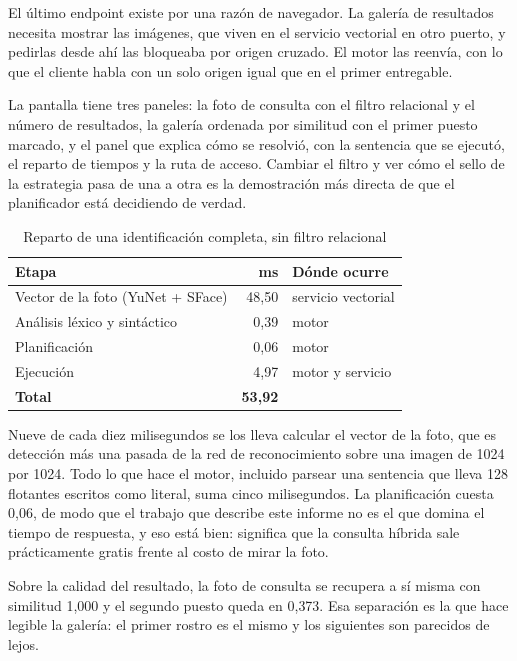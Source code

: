 \documentclass[a4paper,12pt]{article}
\begin{document}
El último endpoint existe por una razón de navegador. La galería de resultados
necesita mostrar las imágenes, que viven en el servicio vectorial en otro
puerto, y pedirlas desde ahí las bloqueaba por origen cruzado. El motor las
reenvía, con lo que el cliente habla con un solo origen igual que en el primer
entregable.

La pantalla tiene tres paneles: la foto de consulta con el filtro relacional y el
número de resultados, la galería ordenada por similitud con el primer puesto
marcado, y el panel que explica cómo se resolvió, con la sentencia que se
ejecutó, el reparto de tiempos y la ruta de acceso. Cambiar el filtro y ver cómo
el sello de la estrategia pasa de una a otra es la demostración más directa de
que el planificador está decidiendo de verdad.

\begin{table}[H]
\centering
\caption{Reparto de una identificación completa, sin filtro relacional}
\begin{tabular}{@{}lrl@{}}
\toprule
\textbf{Etapa} & \textbf{ms} & \textbf{Dónde ocurre} \\
\midrule
Vector de la foto (YuNet + SFace) & 48{,}50 & servicio vectorial \\
Análisis léxico y sintáctico & 0{,}39 & motor \\
Planificación & 0{,}06 & motor \\
Ejecución & 4{,}97 & motor y servicio \\
\midrule
\textbf{Total} & \textbf{53{,}92} & \\
\bottomrule
\end{tabular}
\end{table}

Nueve de cada diez milisegundos se los lleva calcular el vector de la foto, que
es detección más una pasada de la red de reconocimiento sobre una imagen de
1024 por 1024. Todo lo que hace el motor, incluido parsear una sentencia que
lleva 128 flotantes escritos como literal, suma cinco milisegundos. La
planificación cuesta 0{,}06, de modo que el trabajo que describe este informe no
es el que domina el tiempo de respuesta, y eso está bien: significa que la
consulta híbrida sale prácticamente gratis frente al costo de mirar la foto.

Sobre la calidad del resultado, la foto de consulta se recupera a sí misma con
similitud 1{,}000 y el segundo puesto queda en 0{,}373. Esa separación es la que
hace legible la galería: el primer rostro es el mismo y los siguientes son
parecidos de lejos.
\end{document}
